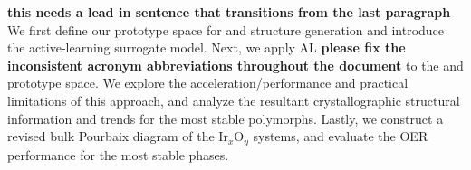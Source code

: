 

%
%
\textbf{this needs a lead in sentence that transitions from the last paragraph}
We first define our prototype space for \IrOtwo and \IrOthree structure generation and introduce the active-learning surrogate model.
%
Next, we apply AL \textbf{please fix the inconsistent acronym abbreviations throughout the document} to the \IrOtwo and \IrOthree prototype space. We explore the acceleration/performance and practical limitations of this approach, and analyze the resultant crystallographic structural information and trends for the most stable polymorphs.
%
%
Lastly, we construct a revised bulk Pourbaix diagram of the Ir$_x$O$_y$ systems, and evaluate the OER performance for the most stable phases.

%









